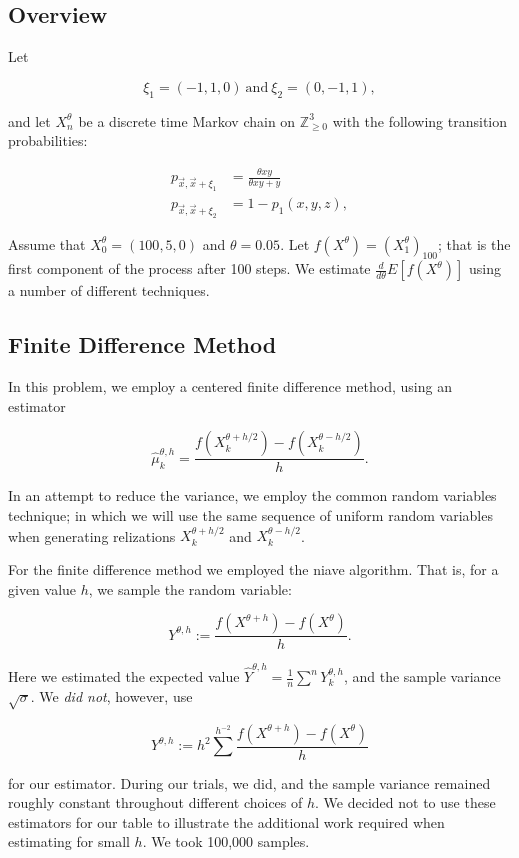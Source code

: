 \subsection{Overview}\label{overview}

Let

\[
\xi_1 = (-1, 1, 0) \ \text{and}\ \xi_2 = (0, -1, 1),
\]

and let \(X^\theta_n\) be a discrete time Markov chain on
\(\mathbb{Z}^3_{\geq 0}\) with the following transition probabilities:

\begin{align}
p_{\vec x, \vec x + \xi_1} &= \frac{\theta xy}{\theta xy + y} \\
p_{\vec x, \vec x + \xi_2} &= 1 - p_1(x,y,z),
\end{align}

Assume that \(X^\theta_0 = (100, 5, 0)\) and \(\theta = 0.05\). Let
\(f(X^\theta) = \left(X^\theta_1\right)_{100}\); that is the first
component of the process after 100 steps. We estimate
\(\frac{d}{d\theta} E\left[f(X^\theta)\right]\) using a number of
different techniques.

\subsection{Finite Difference Method}\label{finite-difference-method}

In this problem, we employ a centered finite difference method, using an
estimator

\[
\hat \mu^{\theta, h}_k
      = \frac{f(X^{\theta + h/2}_k) - f(X^{\theta - h/2}_k)}{h}.
\]

In an attempt to reduce the variance, we employ the common random
variables technique; in which we will use the same sequence of uniform
random variables when generating relizations \(X^{\theta + h/2}_k\) and
\(X^{\theta - h/2}_k\).

For the finite difference method we employed the niave algorithm. That
is, for a given value \(h\), we sample the random variable:

\[
Y^{\theta,h} := \frac{f(X^{\theta + h}) - f(X^{\theta})}{h}.
\]

Here we estimated the expected value
\(\hat Y^{\theta,h} = \frac{1}{n} \sum^n Y^{\theta,h}_k\), and the
sample variance \(\sqrt{\sigma}\). We \emph{did not}, however, use

\[
Y^{\theta, h} := h^2 \sum^{h^{-2}} \frac{f(X^{\theta + h}) - f(X^{\theta})}{h}
\]

for our estimator. During our trials, we did, and the sample variance
remained roughly constant throughout different choices of \(h\). We
decided not to use these estimators for our table to illustrate the
additional work required when estimating for small \(h\). We took
100,000 samples.

